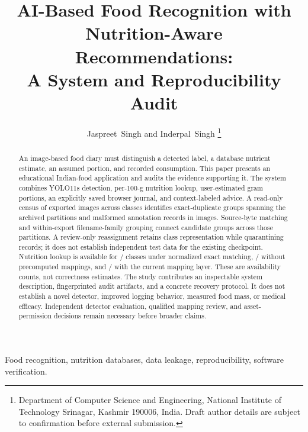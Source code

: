 \documentclass[12pt,journal,draftclsnofoot,onecolumn]{IEEEtran}
\begin{document}
\title{AI-Based Food Recognition with Nutrition-Aware Recommendations:\\A System and Reproducibility Audit}
\author{Jaspreet~Singh and Inderpal~Singh%
\thanks{Department of Computer Science and Engineering, National Institute of Technology Srinagar, Kashmir 190006, India. Draft author details are subject to confirmation before external submission.}}
\maketitle

\begin{abstract}
An image-based food diary must distinguish a detected label, a database nutrient estimate, an assumed portion, and recorded consumption. This paper presents an educational Indian-food application and audits the evidence supporting it. The system combines YOLO11s detection, per-100-g nutrition lookup, user-estimated gram portions, an explicitly saved browser journal, and context-labeled advice. A read-only census of \AuditImages{} exported images across \AuditClasses{} classes identifies \AuditDuplicateGroups{} exact-duplicate groups spanning the archived partitions and malformed annotation records in \AuditFlaggedImages{} images. Source-byte matching and within-export filename-family grouping connect \CandidateOldOverlapGroups{} candidate groups across those partitions. A review-only reassignment retains class representation while quarantining \CandidateQuarantinedImages{} records; it does not establish independent test data for the existing checkpoint. Nutrition lookup is available for \CoverageExact{}/\AuditClasses{} classes under normalized exact matching, \CoverageAutomatic{}/\AuditClasses{} without precomputed mappings, and \CoverageCurrent{}/\AuditClasses{} with the current mapping layer. These are availability counts, not correctness estimates. The study contributes an inspectable system description, fingerprinted audit artifacts, and a concrete recovery protocol. It does not establish a novel detector, improved logging behavior, measured food mass, or medical efficacy. Independent detector evaluation, qualified mapping review, and asset-permission decisions remain necessary before broader claims.
\end{abstract}
\begin{IEEEkeywords}
Food recognition, nutrition databases, data leakage, reproducibility, software verification.
\end{IEEEkeywords}
\end{document}

